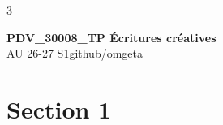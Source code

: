 \documentclass[12pt, a4paper]{article}
\newcommand{\mytitle}{PDV\_30008\_TP Écritures créatives}
\newcommand{\myauthor}{github/omgeta}
\newcommand{\mydate}{AU 26-27 S1}
\begin{document}
\raggedright
\footnotesize
\begin{multicols*}{3}
\setlength{\premulticols}{1pt}
\setlength{\postmulticols}{1pt}
\setlength{\multicolsep}{1pt}
\setlength{\columnsep}{2pt}

{\normalsize{\textbf{\mytitle}}}\\
{\footnotesize{\mydate\hspace{2pt}\textemdash\hspace{2pt}\myauthor}}
\section{Section 1}
\end{multicols*}
\end{document}

